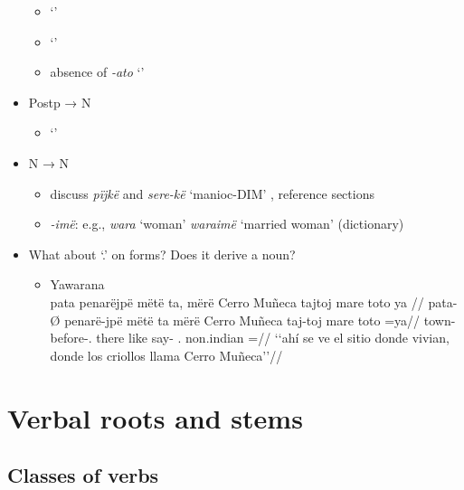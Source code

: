 \documentclass{memoir}
\begin{document}
\begin{itemize}
  \begin{itemize}
  \tightlist
  \item
     `'
  \item
     `'
  \item
    absence of \emph{-ato} `'
  \end{itemize}
\item
  Postp → N

  \begin{itemize}
  \tightlist
  \item
     `'
  \end{itemize}
\item
  N → N

  \begin{itemize}
  \tightlist
  \item
    discuss \emph{pïjkë} and \emph{sere-kë} `manioc-DIM' , reference
    sections
  \item
    \emph{-imë}: e.g., \emph{wara} `woman' \emph{waraimë} `married
    woman' (dictionary)
  \end{itemize}
\item
  What about  `.' on  forms? Does it
  derive a noun?

  \begin{itemize}
  \item
    \ex Yawarana \\
    \label{histyarirdi-592}    \begingl
      \glpreamble pata penarëjpë mëtë ta, mërë Cerro Muñeca tajtoj mare toto ya //
      \gla pata-Ø penarë-jpë mëtë ta mërë Cerro Muñeca taj-toj mare toto =ya//
      \glb town- before-. there like   say- . non.indian =//
          \glft ‘‘ahí se ve el sitio donde vivian, donde los criollos llama Cerro Muñeca’’//  
      \endgl 
    \xe
  \end{itemize}
\end{itemize}

\chapter{\texorpdfstring{Verbal roots and stems
\label{verbderiv}}{Verbal roots and stems }}

\section{Classes of verbs}
\end{document}
